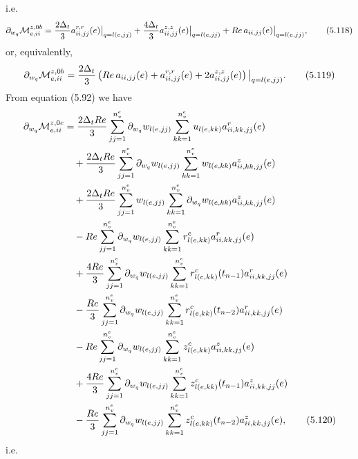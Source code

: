 \documentclass{article}
\begin{document}
i.e.
\begin{equation}
\partial_{w_q}\mathcal{M}_{e,ii}^{z,0b} = \frac{2\Delta_t}{3} a_{ii,jj}^{r,r}(e) \big|_{q=l(e,jj)} + \frac{4\Delta_t}{3} a_{ii,jj}^{z,z}(e) \big|_{q=l(e,jj)} + Re\, a_{ii,jj}(e) \big|_{q=l(e,jj)}, \tag{5.118}
\end{equation}
or, equivalently,
\begin{equation}
\partial_{w_q}\mathcal{M}_{e,ii}^{z,0b} = \frac{2\Delta_t}{3} \left( Re\, a_{ii,jj}(e) + a_{ii,jj}^{r,r}(e) + 2 a_{ii,jj}^{z,z}(e) \right) \big|_{q=l(e,jj)}. \tag{5.119}
\end{equation}
From equation (5.92) we have
\begin{align}
\partial_{w_q}\mathcal{M}_{e,ii}^{z,0c} &= \frac{2\Delta_t Re}{3} \sum_{jj=1}^{n_v^e} \partial_{w_q} w_{l(e,jj)} \sum_{kk=1}^{n_v^e} u_{l(e,kk)} a_{ii,kk,jj}^r(e) \nonumber\\
&\quad + \frac{2\Delta_t Re}{3} \sum_{jj=1}^{n_v^e} \partial_{w_q} w_{l(e,jj)} \sum_{kk=1}^{n_v^e} w_{l(e,kk)} a_{ii,kk,jj}^z(e) \nonumber\\
&\quad + \frac{2\Delta_t Re}{3} \sum_{jj=1}^{n_v^e} w_{l(e,jj)} \sum_{kk=1}^{n_v^e} \partial_{w_q} w_{l(e,kk)} a_{ii,kk,jj}^z(e) \nonumber\\
&\quad - Re \sum_{jj=1}^{n_v^e} \partial_{w_q} w_{l(e,jj)} \sum_{kk=1}^{n_v^e} r_{l(e,kk)}^c a_{ii,kk,jj}^r(e) \nonumber\\
&\quad + \frac{4Re}{3} \sum_{jj=1}^{n_v^e} \partial_{w_q} w_{l(e,jj)} \sum_{kk=1}^{n_v^e} r_{l(e,kk)}^c(t_{n-1}) a_{ii,kk,jj}^r(e) \nonumber\\
&\quad - \frac{Re}{3} \sum_{jj=1}^{n_v^e} \partial_{w_q} w_{l(e,jj)} \sum_{kk=1}^{n_v^e} r_{l(e,kk)}^c(t_{n-2}) a_{ii,kk,jj}^r(e) \nonumber\\
&\quad - Re \sum_{jj=1}^{n_v^e} \partial_{w_q} w_{l(e,jj)} \sum_{kk=1}^{n_v^e} z_{l(e,kk)}^c a_{ii,kk,jj}^z(e) \nonumber\\
&\quad + \frac{4Re}{3} \sum_{jj=1}^{n_v^e} \partial_{w_q} w_{l(e,jj)} \sum_{kk=1}^{n_v^e} z_{l(e,kk)}^c(t_{n-1}) a_{ii,kk,jj}^z(e) \nonumber\\
&\quad - \frac{Re}{3} \sum_{jj=1}^{n_v^e} \partial_{w_q} w_{l(e,jj)} \sum_{kk=1}^{n_v^e} z_{l(e,kk)}^c(t_{n-2}) a_{ii,kk,jj}^z(e), \tag{5.120}
\end{align}
i.e.
\end{document}
